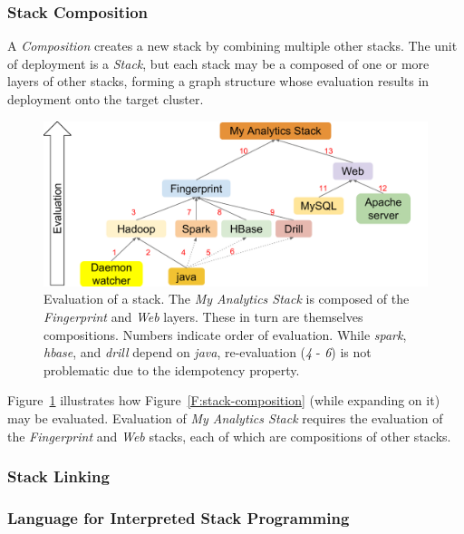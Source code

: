 \subsubsection{Stack Composition} \label{S:composition}

A {\it Composition} creates a new stack by combining multiple other
stacks.  The unit of deployment is a {\it Stack}, but each stack may
be a composed of one or more layers of other stacks, forming a graph
structure whose evaluation results in deployment onto the target
cluster.

\begin{figure}
\centering
\includegraphics[width=1\columnwidth]{images/cloudmesh-stack-graph.pdf}
\caption{Evaluation of a stack.
  The {\it My Analytics Stack} is composed of the {\it Fingerprint} and {\it Web} layers.
  These in turn are themselves compositions.
  Numbers indicate order of evaluation.
  While {\it spark}, {\it hbase}, and {\it drill} depend on {\it java}, 
  re-evaluation (\textit{4} - \textit{6}) is not problematic due to the idempotency property.
  \label{F:stack-graph}}
\end{figure}

Figure~\ref{F:stack-graph} illustrates how Figure~\ref{F:stack-composition} (while expanding on it) may be evaluated.
Evaluation of {\it My Analytics Stack} requires the evaluation of the
{\it Fingerprint} and {\it Web} stacks, each of which are compositions of other stacks.


\subsubsection{Stack Linking} \label{S:stack-linking}

\subsubsection{Language for Interpreted Stack Programming} \label{S:stack-lisp}


